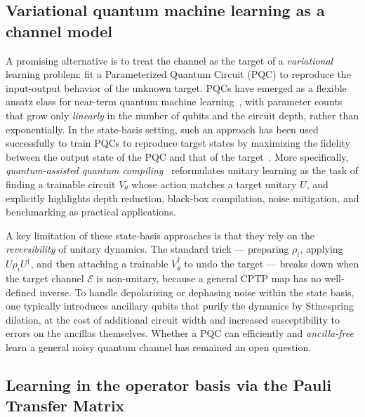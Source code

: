 \documentclass[%
 reprint,
superscriptaddress,
 amsmath,amssymb,
 aps,
]{revtex4-2}
\begin{document}
\subsection*{Variational quantum machine learning as a channel model}

A promising alternative is to treat the channel as the target of a \emph{variational} learning problem: fit a Parameterized Quantum Circuit (PQC) to reproduce the input-output behavior of the unknown target. PQCs have emerged as a flexible ansatz class for near-term quantum machine learning~\cite{benedetti2019pqc,cerezo2021variational,bharti2022nisq}, with parameter counts that grow only \emph{linearly} in the number of qubits and the circuit depth, rather than exponentially. In the state-basis setting, such an approach has been used successfully to train PQCs to reproduce target states by maximizing the fidelity between the output state of the PQC and that of the target~\cite{beer2020training}. More specifically, \emph{quantum-assisted quantum compiling}~\cite{khatri2019qaqc,sharma2020noiseresilience} reformulates unitary learning as the task of finding a trainable circuit $V_\theta$ whose action matches a target unitary $U$, and explicitly highlights depth reduction, black-box compilation, noise mitigation, and benchmarking as practical applications.

A key limitation of these state-basis approaches is that they rely on the \emph{reversibility} of unitary dynamics. The standard trick --- preparing $\rho_i$, applying $U\rho_i U^\dagger$, and then attaching a trainable $V_\theta^\dagger$ to undo the target --- breaks down when the target channel $\mathcal{E}$ is non-unitary, because a general CPTP map has no well-defined inverse. To handle depolarizing or dephasing noise within the state basis, one typically introduces ancillary qubits that purify the dynamics by Stinespring dilation, at the cost of additional circuit width and increased susceptibility to errors on the ancillas themselves. Whether a PQC can efficiently and \emph{ancilla-free} learn a general noisy quantum channel has remained an open question.

\subsection*{Learning in the operator basis via the Pauli Transfer Matrix}
\end{document}
